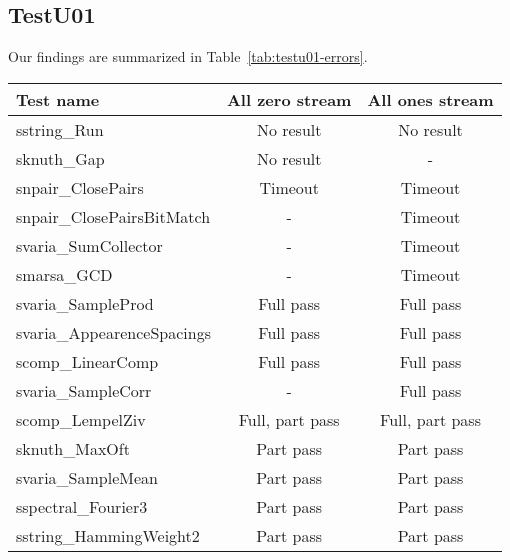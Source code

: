 \documentclass[
  digital,  	%
  color,		%
  oneside,   	%
  12pt,
  nocover,
  notable,
  nolof,
  nolot,
]{fithesis3}
\begin{document}
\subsection*{TestU01}
Our findings are summarized in Table~\ref{tab:testu01-errors}.

\begin{table}[h!]
\begin{nomar}
\centering
\begin{tabular}{l || c | c }
\textbf{Test name}                 & \textbf{All zero stream} & \textbf{All ones stream} \\ \hline \hline    
sstring\_Run                       & No result                & No result                \\
sknuth\_Gap                        & No result                & -                        \\ \hline
snpair\_ClosePairs                 & Timeout                  & Timeout                  \\
snpair\_ClosePairsBitMatch         & -                        & Timeout                  \\
svaria\_SumCollector               & -                        & Timeout                  \\
smarsa\_GCD                        & -                        & Timeout                  \\ \hline
svaria\_SampleProd                 & Full pass                & Full pass                \\
svaria\_AppearenceSpacings         & Full pass                & Full pass                \\   
scomp\_LinearComp                  & Full pass                & Full pass                \\
svaria\_SampleCorr                 & -                        & Full pass                \\
scomp\_LempelZiv                   & Full, part pass          & Full, part pass          \\ \hline
sknuth\_MaxOft                     & Part pass                & Part pass                \\
svaria\_SampleMean                 & Part pass                & Part pass                \\
sspectral\_Fourier3                & Part pass                & Part pass                \\
sstring\_HammingWeight2            & Part pass                & Part pass                \\

\end{tabular}
\end{nomar}
\end{table}
\end{document}
